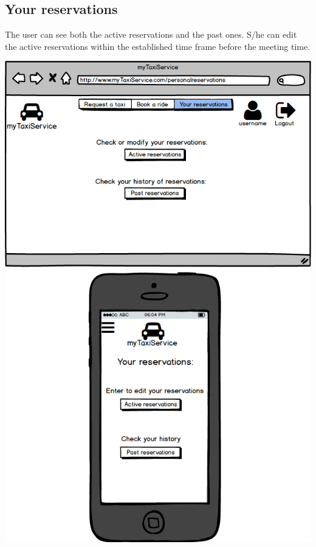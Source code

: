 \documentclass[a4paper,11pt]{report} %
\begin{document}
	\subsection{Your reservations} The user can see both the active reservations and the past ones. S/he can edit the active reservations within the established time frame before the meeting time.
	\begin{center}
		\includegraphics[width=0.9\linewidth]{Pictures/YourReservations}
	\end{center}
	\pagebreak
	
\end{document}
